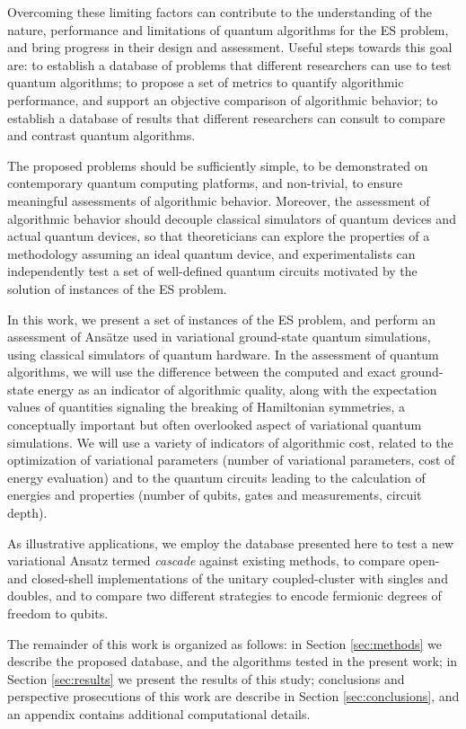 \documentclass[aps,pra,twocolumn]{revtex4-2}
\begin{document}
Overcoming these limiting factors can contribute to the understanding of the nature, performance and limitations of quantum algorithms for the ES problem, and bring progress in their design and assessment.
Useful steps towards this goal are:
to establish a database of problems that different researchers can use to test quantum algorithms;
to propose a set of metrics to quantify algorithmic performance, and support an objective comparison of algorithmic behavior;
to establish a database of results that different researchers can consult to compare and contrast quantum algorithms.

The proposed problems should be sufficiently simple, to be demonstrated on contemporary quantum computing platforms, and non-trivial, to ensure meaningful assessments of algorithmic behavior.
Moreover, the assessment of algorithmic behavior should decouple classical simulators of quantum devices and actual quantum devices,
so that theoreticians can explore the properties of a methodology assuming an ideal quantum device, and experimentalists can independently test a set of well-defined quantum circuits motivated by the solution of instances of the ES problem.
 
In this work, we present a set of instances of the ES problem, and perform an assessment of Ans\"{a}tze used in variational ground-state quantum simulations,
using classical simulators of quantum hardware.
In the assessment of quantum algorithms, we will use the difference between the computed and exact ground-state energy as an indicator of algorithmic quality,
along with the expectation values of quantities signaling the breaking of Hamiltonian symmetries, a conceptually important but often overlooked aspect of variational quantum simulations.
We will use a variety of indicators of algorithmic cost, related to the optimization of variational parameters (number of variational parameters, cost of energy evaluation)
and to the quantum circuits leading to the calculation of energies and properties (number of qubits, gates and measurements, circuit depth).

As illustrative applications, we employ the database presented here to test a new variational Ansatz termed {\em{cascade}} against existing methods,
to compare open- and closed-shell implementations of the unitary coupled-cluster with singles and doubles, 
and to compare two different strategies to encode fermionic degrees of freedom to qubits.

The remainder of this work is organized as follows: 
in Section \ref{sec:methods} we describe the proposed database, and the algorithms tested in the present work;
in Section \ref{sec:results} we present the results of this study;
conclusions and perspective prosecutions of this work are describe in Section \ref{sec:conclusions},
and an appendix contains additional computational details.
\end{document}
